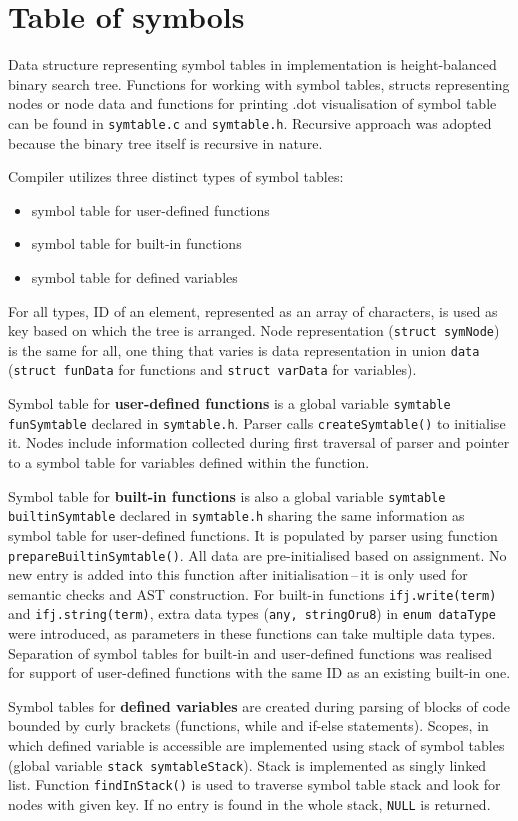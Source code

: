 \documentclass[a4paper, 11pt]{article}
\begin{document}
\section{Table of symbols}\label{sec:SYMTABLE}
Data structure representing symbol tables in implementation is height-balanced binary search tree.
Functions for working with symbol tables, structs representing nodes or node data and functions for printing
.dot visualisation of symbol table can be found in \verb|symtable.c| and \verb|symtable.h|. Recursive approach was adopted because the binary tree itself is recursive in nature.
\par
Compiler utilizes three distinct types of symbol tables: 
\begin{itemize}
    \item symbol table for user-defined functions
    \item symbol table for built-in functions
    \item symbol table for defined variables
\end{itemize}
 For all types, ID of an element, represented as
an array of characters, is used as key based on which the tree is arranged. Node representation (\verb|struct symNode|) is the same for all, one thing that varies
is data representation in union \verb|data| (\verb|struct funData| for functions and \verb|struct varData| for variables).
\par
Symbol table for \textbf{user-defined functions} is a global variable \verb|symtable funSymtable| declared in \newline\verb|symtable.h|. Parser calls
\verb|createSymtable()| to initialise it. Nodes include information collected during first traversal of parser and pointer 
to a symbol table for variables defined within the function.
\par
Symbol table for \textbf{built-in functions} is also a global variable \verb|symtable builtinSymtable| declared in \verb|symtable.h| sharing
the same information as symbol table for user-defined functions. It is populated by parser using function \verb|prepareBuiltinSymtable()|.
All data are pre-initialised based on assignment. No new entry is added into this function after initialisation\,--\,it is only used
for semantic checks and AST construction. For built-in functions \verb|ifj.write(term)| and \verb|ifj.string(term)|, extra
data types (\verb|any, stringOru8|) in \verb|enum dataType| were introduced, as parameters in these functions can take multiple data types. Separation
of symbol tables for built-in and user-defined functions was realised for support of user-defined functions with the same ID as an existing built-in one.
\par
Symbol tables for \textbf{defined variables} are created during parsing of blocks of code bounded by curly brackets (functions, while and if-else statements).
Scopes, in which defined variable is accessible are implemented using stack of symbol tables (global variable \verb|stack symtableStack|).
Stack is implemented as singly linked list. Function \verb|findInStack()| is used to traverse symbol table stack and look for nodes with given key.
If no entry is found in the whole stack, \verb|NULL| is returned.
\end{document}
